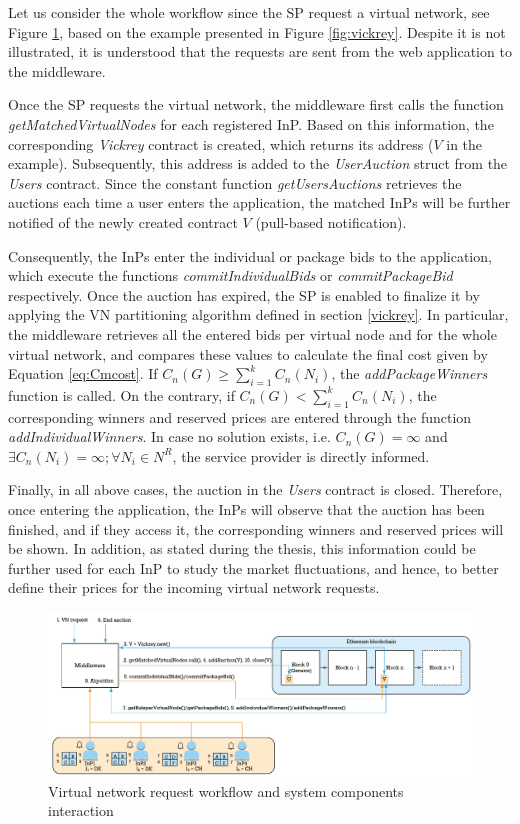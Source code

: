 Let us consider the whole workflow since the SP request a virtual network, see Figure \ref{fig:implementationWorkflow}, based on the example presented in Figure \ref{fig:vickrey}. Despite it is not illustrated, it is understood that the requests are sent from the web application to the middleware.

Once the SP requests the virtual network, the middleware first calls the function \textit{getMatchedVirtualNodes} for each registered InP. Based on this information, the corresponding \textit{Vickrey} contract is created, which returns its address ($V$ in the example). Subsequently, this address is added to the \textit{UserAuction} struct from the \textit{Users} contract. Since the constant function \textit{getUsersAuctions} retrieves the auctions each time a user enters the application, the matched InPs will be further notified of the newly created contract $V$ (pull-based notification).

Consequently, the InPs enter the individual or package bids to the application, which execute the functions \textit{commitIndividualBids} or \textit{commitPackageBid} respectively. Once the auction has expired, the SP is enabled to finalize it by applying the VN partitioning algorithm defined in section \ref{vickrey}. In particular, the middleware retrieves all the entered bids per virtual node and for the whole virtual network, and compares these values to calculate the final cost given by Equation \ref{eq:Cmcost}. If $C_n(G) \geq \sum_{i=1}^{k} C_n(N_i)$, the \textit{addPackageWinners} function is called. On the contrary, if $C_n(G) < \sum_{i=1}^{k} C_n(N_i)$, the corresponding winners and reserved prices are entered through the function \textit{addIndividualWinners}. In case no solution exists, i.e. $C_n(G) = \infty$ and $\exists C_n(N_i) = \infty; \forall N_i \in N^{R}$, the service provider is directly informed.

Finally, in all above cases, the auction in the \textit{Users} contract is closed. Therefore, once entering the application, the InPs will observe that the auction has been finished, and if they access it, the corresponding winners and reserved prices will be shown. In addition, as stated during the thesis, this information could be further used for each InP to study the market fluctuations, and hence, to better define their prices for the incoming virtual network requests.

\begin{figure}[bth]
	\centering
	\includegraphics[width=1\linewidth]{gfx/implementation_workflow}    
  	\caption{Virtual network request workflow and system components interaction}
  	\label{fig:implementationWorkflow}
\end{figure}

